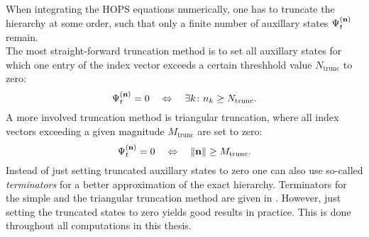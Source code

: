 When integrating the HOPS equations numerically, one has to truncate the hierarchy at some order,
such that only a finite number of auxillary states $\Psi_t^{(\vectorbold{n})}$ remain. \\
The most straight-forward truncation method is to set all auxillary states for which
one entry of the index vector exceeds a certain threshhold value $N_\text{trunc}$ to zero:
\begin{equation}
    \label{eq:simple_truncation}
    \Psi_t^{(\vectorbold{n})} = 0 \quad \Leftrightarrow \quad \exists k \colon n_k \ge N_\text{trunc}.
\end{equation}
A more involved truncation method is triangular truncation, where all index vectors exceeding
a given magnitude $M_\text{trunc}$ are set to zero:
\begin{equation*}
    \Psi_t^{(\vectorbold{n})} = 0 \quad \Leftrightarrow \quad \norm{\vectorbold{n}} \ge M_\text{trunc}.
\end{equation*}
Instead of just setting truncated auxillary states to zero one can also use so-called 
\textit{terminators} for a better approximation of the exact hierarchy. Terminators for the
simple and the triangular truncation method are given in \cite{Suess:2014}. However, just setting
the truncated states to zero yields good results in practice. This is done throughout all computations
in this thesis.